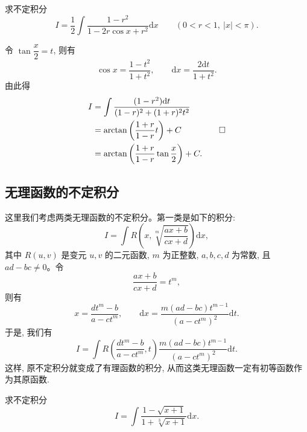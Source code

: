 \begin{example}\label{example:ma-6-3-7}
求不定积分
\[
  I=\frac12\int\frac{1-r^2}{1-2r\cos x+r^2}\mathrm dx
  \qquad(0<r<1,\ |x|<\pi).
\]
\end{example}

\begin{solve}
令 $\tan\dfrac x2=t$, 则有
\[
  \cos x=\frac{1-t^2}{1+t^2},\qquad
  \mathrm dx=\frac{2\mathrm dt}{1+t^2}.
\]
由此得
\[
\begin{aligned}
  I
  &=
  \int\frac{(1-r^2)\mathrm dt}{(1-r)^2+(1+r)^2t^2}\\
  &=
  \arctan\left(\frac{1+r}{1-r}t\right)+C\\
  &=
  \arctan\left(\frac{1+r}{1-r}\tan\frac x2\right)+C.
\end{aligned}
\qedhere
\]
\end{solve}


\subsection{无理函数的不定积分}
\label{subsec:ma-6-3-3}

这里我们考虑两类无理函数的不定积分。第一类是如下的积分:
\[
  I=\int R\left(x,\sqrt[m]{\frac{ax+b}{cx+d}}\right)\mathrm dx,
\]
其中 $R(u,v)$ 是变元 $u,v$ 的二元函数, $m$ 为正整数, $a,b,c,d$ 为常数, 且 $ad-bc\ne0$。令
\[
  \frac{ax+b}{cx+d}=t^m,
\]
则有
\[
  x=\frac{dt^m-b}{a-ct^m},\qquad
  \mathrm dx=\frac{m(ad-bc)t^{m-1}}{(a-ct^m)^2}\mathrm dt.
\]
于是, 我们有
\[
  I=
  \int R\left(\frac{dt^m-b}{a-ct^m},t\right)
  \frac{m(ad-bc)t^{m-1}}{(a-ct^m)^2}\mathrm dt.
\]
这样, 原不定积分就变成了有理函数的积分, 从而这类无理函数一定有初等函数作为其原函数.

\begin{example}\label{example:ma-6-3-8}
求不定积分
\[
  I=\int\frac{1-\sqrt{x+1}}{1+\sqrt[3]{x+1}}\mathrm dx.
\]
\end{example}

